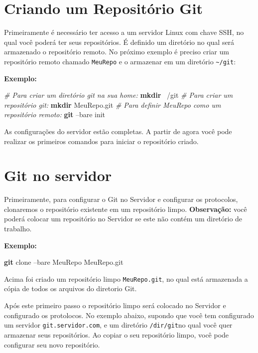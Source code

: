\documentclass[
  a5paper,
  pagesize,
  9pt,
  pointlessnumbers,
  normalheadings,
  twoside=false
]{book}
\newenvironment{Shaded}{\begin{snugshade}}{\end{snugshade}}
\newcommand{\KeywordTok}[1]{\textcolor[rgb]{0.13,0.29,0.53}{\textbf{{#1}}}}
\newcommand{\CommentTok}[1]{\textcolor[rgb]{0.56,0.35,0.01}{\textit{{#1}}}}
\newcommand{\NormalTok}[1]{{#1}}
\begin{document}
\section{Criando um Repositório Git}\label{criando-um-repositorio-git}

Primeiramente é necessário ter acesso a um servidor Linux com chave SSH,
no qual você poderá ter seus repositórios. É definido um diretório no
qual será armazenado o repositório remoto. No próximo exemplo é preciso
criar um repositório remoto chamado \texttt{MeuRepo} e o armazenar em um
diretório \texttt{\textasciitilde{}/git}:

\textbf{Exemplo:}

\begin{Shaded}
\begin{Highlighting}[]
\CommentTok{# Para criar um diretório git na sua home:}
\KeywordTok{mkdir} \NormalTok{~/git}
\CommentTok{# Para criar um repositório git:}
\KeywordTok{mkdir} \NormalTok{MeuRepo.git}
\CommentTok{# Para definir MeuRepo como um repositório remoto:}
\KeywordTok{git} \NormalTok{--bare init}
\end{Highlighting}
\end{Shaded}

As configurações do servidor estão completas. A partir de agora você
pode realizar os primeiros comandos para iniciar o repositório criado.

\section{Git no servidor}\label{git-no-servidor}

Primeiramente, para configurar o Git no Servidor e configurar os
protocolos, clonaremos o repositório existente em um repositório limpo.
\textbf{Observação:} você poderá colocar um repositório no Servidor se
este não contém um diretório de trabalho.

\textbf{Exemplo:}

\begin{Shaded}
\begin{Highlighting}[]
 \KeywordTok{git} \NormalTok{clone --bare MeuRepo MeuRepo.git}
\end{Highlighting}
\end{Shaded}

Acima foi criado um repositório limpo \texttt{MeuRepo.git}, no qual está
armazenada a cópia de todos os arquivos do diretorio Git.

Após este primeiro passo o repositório limpo será colocado no Servidor e
configurado os protolocos. No exemplo abaixo, supondo que você tem
configurado um servidor \texttt{git.servidor.com}, e um diretório
\texttt{/dir/git}no qual você quer armazenar seus repositórios. Ao
copiar o seu repositório limpo, você pode configurar seu novo
repositório.
\end{document}
